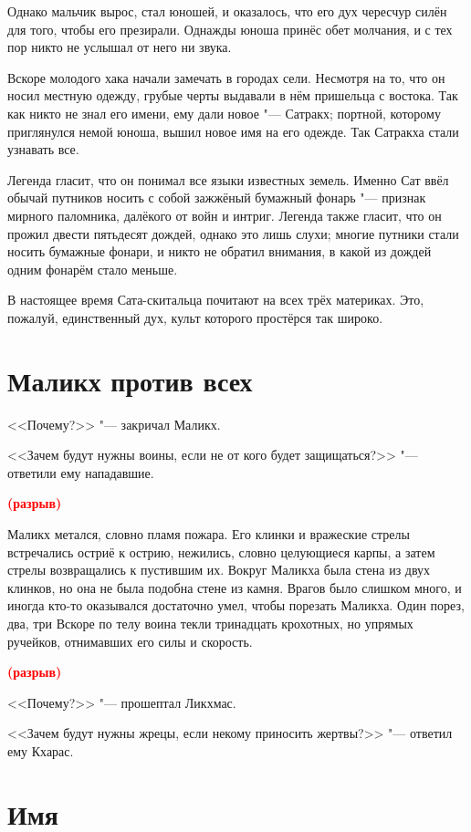 \documentclass[a4paper,10pt]{book}
\newcommand{\ldotst}{\so{...}\xspace}
\newcommand{\spacing}{\textcolor{red}{\textbf{(разрыв)}}}
\begin{document}
Однако мальчик вырос, стал юношей, и оказалось, что его дух чересчур силён для 
того, чтобы его презирали. Однажды юноша принёс обет молчания, и с тех пор 
никто 
не услышал от него ни звука.

Вскоре молодого хака начали замечать в городах сели. Несмотря на то, что он 
носил местную одежду, грубые черты выдавали в нём пришельца с востока. Так как 
никто не знал его имени, ему дали новое "--- Сатракх; портной, которому 
приглянулся немой юноша, вышил новое имя на его одежде. Так Сатракха стали 
узнавать все.

Легенда гласит, что он понимал все языки известных земель. Именно Сат ввёл 
обычай путников носить с собой зажжёный бумажный фонарь "--- признак мирного 
паломника, далёкого от войн и интриг. Легенда также гласит, что он прожил 
двести 
пятьдесят дождей, однако это лишь слухи; многие путники стали носить бумажные 
фонари, и никто не обратил внимания, в какой из дождей одним фонарём стало 
меньше.

В настоящее время Сата-скитальца почитают на всех трёх материках. Это, пожалуй, 
единственный дух, культ которого простёрся так широко.

\section{Маликх против всех}



<<Почему?>> "--- закричал Маликх.

<<Зачем будут нужны воины, если не от кого будет защищаться?>> "--- ответили 
ему нападавшие.

\spacing

Маликх метался, словно пламя пожара. Его клинки и вражеские стрелы встречались 
остриё к острию, нежились, словно целующиеся карпы, а затем стрелы возвращались 
к пустившим их. Вокруг Маликха была стена из двух клинков, но она не была 
подобна стене из камня. Врагов было слишком много, и иногда кто-то оказывался 
достаточно умел, чтобы порезать Маликха. Один порез, два, три\ldotst Вскоре по 
телу воина текли тринадцать крохотных, но упрямых ручейков, отнимавших его силы 
и скорость.

\spacing

<<Почему?>> "--- прошептал Ликхмас.

<<Зачем будут нужны жрецы, если некому приносить жертвы?>> "--- ответил ему 
Кхарас.

\section{Имя}
\end{document}
